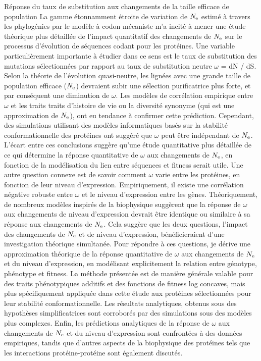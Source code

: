 Réponse du taux de substitution aux changements de la taille efficace de population
La gamme étonnamment étroite de variation de $N_{\textrm{e}}$ estimé à travers les phylogénies par le modèle à codon mécaniste m'a incité à mener une étude théorique plus détaillée de l'impact quantitatif des changements de $N_{\textrm{e}}$ sur le processus d'évolution de séquences codant pour les protéines.
Une variable particulièrement importante à étudier dans ce sens est le taux de substitution des mutations sélectionnées par rapport au taux de substitution neutre $\omega$ = dN / dS.
Selon la théorie de l'évolution quasi-neutre, les lignées avec une grande taille de population efficace ($N_{\textrm{e}}$) devraient subir une sélection purificatrice plus forte, et par conséquent une diminution de $\omega$.
Les modèles de corrélation empirique entre $\omega$ et les traits traits d’histoire de vie ou la diversité synonyme (qui est une approximation de $N_{\textrm{e}}$), ont eu tendance à confirmer cette prédiction.
Cependant, des simulations utilisant des modèles informatiques basés sur la stabilité conformationnelle des protéines ont suggéré que $\omega$ peut être indépendant de $N_{\textrm{e}}$.
L'écart entre ces conclusions suggère qu'une étude quantitative plus détaillée de ce qui détermine la réponse quantitative de $\omega$ aux changements de $N_{\textrm{e}}$, en fonction de la modélisation du lien entre séquences et fitness serait utile.
Une autre question connexe est de savoir comment $\omega$ varie entre les protéines, en fonction de leur niveau d'expression.
Empiriquement, il existe une corrélation négative robuste entre $\omega$ et le niveau d'expression entre les gènes.
Théoriquement, de nombreux modèles inspirés de la biophysique suggèrent que la réponse de $\omega$ aux changements de niveau d'expression devrait être identique ou similaire à sa réponse aux changements de $N_{\textrm{e}}$.
Cela suggère que les deux questions, l'impact des changements de $N_{\textrm{e}}$ et de niveau d'expression, bénéficieraient d'une investigation théorique simultanée.
Pour répondre à ces questions, je dérive une approximation théorique de la réponse quantitative de $\omega$ aux changements de $N_{\textrm{e}}$ et du niveau d'expression, en modélisant explicitement la relation entre génotype, phénotype et fitness.
La méthode présentée est de manière générale valable pour des traits phénotypiques additifs et des fonctions de fitness log concaves, mais plus spécifiquement appliquée dans cette étude aux protéines sélectionnées pour leur stabilité conformationnelle.
Les résultats analytiques, obtenus sous des hypothèses simplificatrices sont corroborés par des simulations sous des modèles plus complexes.
Enfin, les prédictions analytiques de la réponse de $\omega$ aux changements de $N_{\textrm{e}}$ et du niveau d'expression sont confrontées à des données empiriques, tandis que d'autres aspects de la biophysique des protéines tels que les interactions protéine-protéine sont également discutés.

